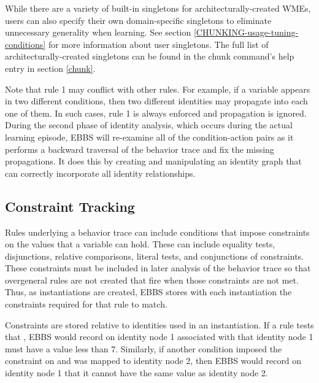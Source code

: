 \begin{enumerate}
\begin{enumerate}
		While there are a variety of built-in singletons for architecturally-created WMEs, users can also specify their own domain-specific singletons to eliminate unnecessary generality when learning.  See section \ref{CHUNKING-usage-tuning-conditions} for more information about user singletons.  The full list of architecturally-created singletons can be found in the chunk command's help entry in section \ref{chunk}.
	\end{enumerate}
\end{enumerate}

Note that rule 1 may conflict with other rules.  For example, if a variable appears in two different conditions, then two different identities may propagate into each one of them.  In such cases, rule 1 is always enforced and propagation is ignored. During the second phase of identity analysis, which occurs during the actual learning episode, EBBS will re-examine all of the condition-action pairs as it performs a backward traversal of the behavior trace and fix the missing propagations.  It does this by creating and manipulating an identity graph that can correctly incorporate all identity relationships.


\subsection{Constraint Tracking}
\label{CHUNKING-constraint-tracking}

Rules underlying a behavior trace can include conditions that impose constraints on the values that a variable can hold. These can include equality tests, disjunctions, relative comparisons, literal tests, and conjunctions of constraints. These constraints must be included in later analysis of the behavior trace so that overgeneral rules are not created that fire when those constraints are not met. Thus, as instantiations are created, EBBS stores with each instantiation the constraints required for that rule to match.

Constraints are stored relative to identities used in an instantiation. If a rule tests that , EBBS would record on identity node 1 associated with  that identity node 1 must have a value less than 7. Similarly, if another condition imposed the constraint  on  and  was mapped to identity node 2, then EBBS would record on identity node 1 that it cannot have the same value as identity node 2.


